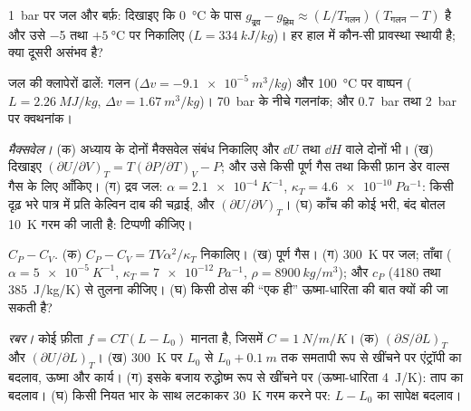 \begin{exercise}[$\star$]\label{exo:b2:thermodynamic-potentials:3}
\qty{1}{bar} पर जल और बर्फ़: दिखाइए कि \qty{0}{\celsius} के पास $g_{\text{द्रव}} - g_{\text{हिम}} \approx
(L/T_{\text{गलन}})(T_{\text{गलन}} - T)$ है और उसे
\qty{-5}{} तथा $+\qty{5}{\celsius}$ पर निकालिए ($L = \qty{334}{kJ/kg}$)। हर हाल में कौन-सी प्रावस्था
स्थायी है; क्या दूसरी असंभव है?
\end{exercise}

\begin{exercise}[$\star$]\label{exo:b2:thermodynamic-potentials:4}
जल की क्लापेरों ढालें: गलन ($\Delta v = -\qty{9.1e-5}{m^3/kg}$) और
\qty{100}{\celsius} पर वाष्पन ($L = \qty{2.26}{MJ/kg}$, $\Delta v =
\qty{1.67}{m^3/kg}$)। \qty{70}{bar} के नीचे गलनांक; और \qty{0.7}{bar} तथा
\qty{2}{bar} पर क्वथनांक।
\end{exercise}

\begin{exercise}[$\star\star$]\label{exo:b2:thermodynamic-potentials:5}
\emph{मैक्सवेल।} (क) अध्याय के दोनों मैक्सवेल संबंध निकालिए
और $\dd U$ तथा $\dd H$ वाले दोनों भी। (ख) दिखाइए $(\partial U/\partial V)_T =
T(\partial P/\partial T)_V - P$; और उसे किसी पूर्ण गैस तथा किसी फ़ान
डेर वाल्स गैस के लिए आँकिए। (ग) द्रव जल: $\alpha = \qty{2.1e-4}{K^{-1}}$, $\kappa_T =
\qty{4.6e-10}{Pa^{-1}}$: किसी दृढ़ भरे पात्र में प्रति केल्विन दाब की चढ़ाई,
और $(\partial U/\partial V)_T$। (घ) काँच की कोई भरी, बंद बोतल
\qty{10}{K} गरम की जाती है: टिप्पणी कीजिए।
\end{exercise}

\begin{exercise}[$\star\star$]\label{exo:b2:thermodynamic-potentials:6}
\emph{$C_P - C_V$.} (क) $C_P - C_V = TV\alpha^2/\kappa_T$ निकालिए। (ख)
पूर्ण गैस। (ग) \qty{300}{K} पर जल; ताँबा ($\alpha = \qty{5e-5}{K^{-1}}$,
$\kappa_T = \qty{7e-12}{Pa^{-1}}$, $\rho = \qty{8900}{kg/m^3}$); और
$c_P$ (\qty{4180}{} तथा \qty{385}{J/kg/K}) से तुलना कीजिए। (घ) किसी ठोस की
``एक ही'' ऊष्मा-धारिता की बात क्यों की जा सकती है?
\end{exercise}

\begin{exercise}[$\star\star$]\label{exo:b2:thermodynamic-potentials:7}
\emph{रबर।} कोई फ़ीता $f = CT(L - L_0)$ मानता है, जिसमें $C = \qty{1}{N/m/K}$।
(क) $(\partial S/\partial L)_T$ और $(\partial U/\partial L)_T$। (ख) \qty{300}{K} पर
$L_0$ से $L_0 + \qty{0.1}{m}$ तक समतापी रूप से खींचने पर एंट्रॉपी का
बदलाव, ऊष्मा और कार्य। (ग) इसके बजाय रुद्धोष्म रूप से खींचने पर (ऊष्मा-धारिता
\qty{4}{J/K}): ताप का बदलाव। (घ) किसी नियत भार के साथ लटकाकर
\qty{30}{K} गरम करने पर: $L - L_0$ का सापेक्ष बदलाव।
\end{exercise}

